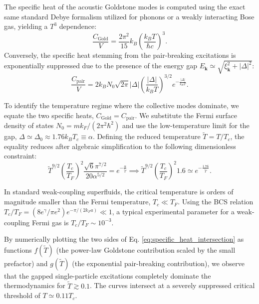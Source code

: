 The specific heat of the acoustic Goldstone modes is computed using the exact same standard Debye formalism utilized for phonons or a weakly interacting Bose gas, yielding a \( T^3 \) dependence:
\[
    \frac{C_{\text{Gold}}}{V} = \frac{2\pi^2}{15} k_B \left( \frac{k_B T}{\hbar c} \right)^3.
\]
Conversely, the specific heat stemming from the pair-breaking excitations is exponentially suppressed due to the presence of the energy gap \( E_{\mathbf{k}} \simeq \sqrt{\xi_{\mathbf{k}}^2 + |\Delta|^2} \):
\[
    \frac{C_{\text{pair}}}{V} = 2k_B N_0 \sqrt{2\pi} |\Delta| \left( \frac{|\Delta|}{k_B T} \right)^{3/2} e^{-\frac{|\Delta|}{k_B T}}.
\]

To identify the temperature regime where the collective modes dominate, we equate the two specific heats, \( C_{\text{Gold}} = C_{\text{pair}} \). We substitute the Fermi surface density of states \( N_0 = m k_F / (2\pi^2 \hbar^2) \) and use the low-temperature limit for the gap, \( \Delta \simeq \Delta_0 \approx 1.76 k_B T_c \equiv \alpha \). Defining the reduced temperature \( \tilde{T} = T/T_c \), the equality reduces after algebraic simplification to the following dimensionless constraint:
\begin{equation} \label{eq:specific_heat_intersection}
    \tilde{T}^{9/2} \left( \frac{T_c}{T_F} \right)^2 \frac{\sqrt{6}\pi^{7/2}}{20 \alpha^{5/2}} = e^{-\frac{\alpha}{\tilde{T}}} \implies \tilde{T}^{9/2} \left( \frac{T_c}{T_F} \right)^2 1.6 \simeq e^{-\frac{1.76}{\tilde{T}}}.
\end{equation}

In standard weak-coupling superfluids, the critical temperature is orders of magnitude smaller than the Fermi temperature, \( T_c \ll T_F \). Using the BCS relation \( T_c/T_F = (8e^\gamma/\pi e^2) e^{-\pi/(2k_F a)} \ll 1 \), a typical experimental parameter for a weak-coupling Fermi gas is \( T_c/T_F \sim 10^{-3} \).


By numerically plotting the two sides of Eq. \eqref{eq:specific_heat_intersection} as functions \( f(\tilde{T}) \) (the power-law Goldstone contribution scaled by the small prefactor) and \( g(\tilde{T}) \) (the exponential pair-breaking contribution), we observe that the gapped single-particle excitations completely dominate the thermodynamics for \( \tilde{T} \gtrsim 0.1 \). The curves intersect at a severely suppressed critical threshold of \( T \simeq 0.11 T_c \).

